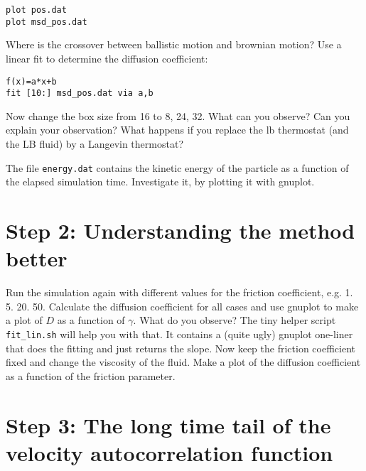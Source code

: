 {\vspace{0,2cm}\small
\begin{lstlisting}[numbers=none]
plot pos.dat
plot msd_pos.dat
\end{lstlisting}\vspace{0,2cm}
}

Where is the crossover between ballistic motion and brownian motion?
Use a linear fit to determine the diffusion coefficient:
{\vspace{0,2cm}\small
\begin{lstlisting}[numbers=none]
f(x)=a*x+b
fit [10:] msd_pos.dat via a,b
\end{lstlisting}\vspace{0,2cm}
}

Now change the box size from 16 to 8, 24, 32. What can you observe?
Can you explain your observation?
What happens if you replace the lb thermostat (and the LB fluid)
by a Langevin thermostat?

The file \lstinline|energy.dat| contains the kinetic energy of the
particle as a function of the elapsed simulation time. Investigate
it, by plotting it with gnuplot. 

\section{Step 2: Understanding the method better}
Run the simulation again with different values for the friction
coefficient, e.g. 1. 5. 20. 50. Calculate the diffusion
coefficient for all cases and use gnuplot to make a plot of
$D$ as a function of $\gamma$. What do you observe?
The tiny helper script \lstinline|fit_lin.sh| will help you with that. It contains
a (quite ugly) gnuplot one-liner that does the fitting and just
returns the slope. Now keep the friction coefficient fixed and
change the viscosity of the fluid. Make a plot of the diffusion coefficient
as a function of the friction parameter.

\section{Step 3: The long time tail of the velocity autocorrelation function}

